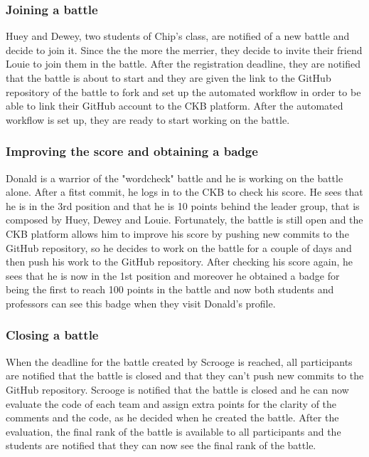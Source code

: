 \subsubsection{Joining a battle}
Huey and Dewey, two students of Chip's class, are notified of a new battle and decide to join it.
Since the the more the merrier, they decide to invite their friend Louie to join them in the battle.
After the registration deadline, they are notified that the battle is about to start and they are given the link to the GitHub repository of the battle to fork and set up the automated workflow in order to be able to link their GitHub account to the CKB platform.
After the automated workflow is set up, they are ready to start working on the battle.

\subsubsection{Improving the score and obtaining a badge}
Donald is a warrior of the "wordcheck" battle and he is working on the battle alone.
After a fitst commit, he logs in to the CKB to check his score.
He sees that he is in the 3rd position and that he is 10 points behind the leader group, that is composed by Huey, Dewey and Louie.
Fortunately, the battle is still open and the CKB platform allows him to improve his score by pushing new commits to the GitHub repository, so he decides to work on the battle for a couple of days and then push his work to the GitHub repository.
After checking his score again, he sees that he is now in the 1st position and moreover he obtained a badge for being the first to reach 100 points in the battle and now both students and professors can see this badge when they visit Donald's profile.

\subsubsection{Closing a battle}
When the deadline for the battle created by Scrooge is reached, all participants are notified that the battle is closed and that they can't push new commits to the GitHub repository.
Scrooge is notified that the battle is closed and he can now evaluate the code of each team and assign extra points for the clarity of the comments and the code, as he decided when he created the battle.
After the evaluation, the final rank of the battle is available to all participants and the students are notified that they can now see the final rank of the battle.

